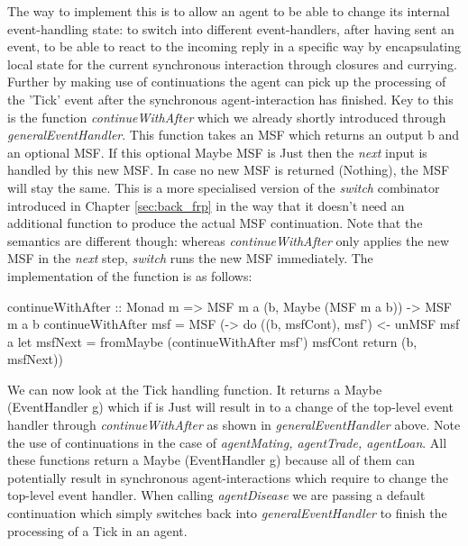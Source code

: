 The way to implement this is to allow an agent to be able to change its internal event-handling state: to switch into different event-handlers, after having sent an event, to be able to react to the incoming reply in a specific way by encapsulating local state for the current synchronous interaction through closures and currying. Further by making use of continuations the agent can pick up the processing of the 'Tick' event after the synchronous agent-interaction has finished. Key to this is the function \textit{continueWithAfter} which we already shortly introduced through \textit{generalEventHandler}. This function takes an MSF which returns an output b and an optional MSF. If this optional Maybe MSF is Just then the \textit{next} input is handled by this new MSF. In case no new MSF is returned (Nothing), the MSF will stay the same. This is a more specialised version of the \textit{switch} combinator introduced in Chapter \ref{sec:back_frp} in the way that it doesn't need an additional function to produce the actual MSF continuation. Note that the semantics are different though: whereas \textit{continueWithAfter} only applies the new MSF in the \textit{next} step, \textit{switch} runs the new MSF immediately. The implementation of the function is as follows:

\begin{HaskellCode}
continueWithAfter :: Monad m => MSF m a (b, Maybe (MSF m a b)) -> MSF m a b
continueWithAfter msf = MSF (\a -> do
  ((b, msfCont), msf') <- unMSF msf a
  let msfNext = fromMaybe (continueWithAfter msf') msfCont
  return (b, msfNext))
\end{HaskellCode}

We can now look at the Tick handling function. It returns a Maybe (EventHandler g) which if is Just will result in to a change of the top-level event handler through \textit{continueWithAfter} as shown in \textit{generalEventHandler} above. Note the use of continuations in the case of \textit{agentMating, agentTrade, agentLoan}. All these functions return a Maybe (EventHandler g) because all of them can potentially result in synchronous agent-interactions which require to change the top-level event handler. When calling \textit{agentDisease} we are passing a default continuation which simply switches back into \textit{generalEventHandler} to finish the processing of a Tick in an agent.

